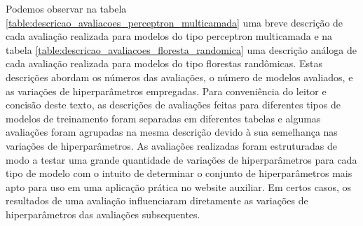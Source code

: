 Podemos observar na tabela \ref{table:descricao_avaliacoes_perceptron_multicamada} uma breve descrição de cada avaliação realizada para modelos do tipo perceptron multicamada e na tabela \ref{table:descricao_avaliacoes_floresta_randomica} uma descrição análoga de cada avaliação realizada para modelos do tipo florestas randômicas. Estas descrições abordam os números das avaliações, o número de modelos avaliados, e as variações de hiperparâmetros empregadas. Para conveniência do leitor e concisão deste texto, as descrições de avaliações feitas para diferentes tipos de modelos de treinamento foram separadas em diferentes tabelas e algumas avaliações foram agrupadas na mesma descrição devido à sua semelhança nas variações de hiperparâmetros. As avaliações realizadas foram estruturadas de modo a testar uma grande quantidade de variações de hiperparâmetros para cada tipo de modelo com o intuito de determinar o conjunto de hiperparâmetros mais apto para uso em uma aplicação prática no website auxiliar. Em certos casos, os resultados de uma avaliação influenciaram diretamente as variações de hiperparâmetros das avaliações subsequentes.

